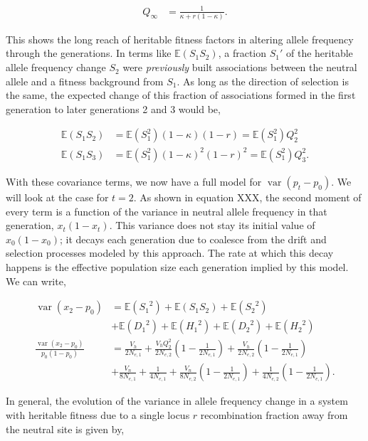 \documentclass[11pt]{article}
\newcommand{\E}{\mathbb{E}}
\DeclareMathOperator{\var}{var}
\begin{document}
\begin{align}
  \label{eq:Qinf}
  Q_\infty &= \frac{1}{\kappa + r(1-\kappa)}.
\end{align}

This shows the long reach of heritable fitness factors in altering allele
frequency through the generations. In terms like $\E(S_1 S_2)$, a fraction
$S_1'$ of the heritable allele frequency change $S_2$ were \emph{previously}
built associations between the neutral allele and a fitness background from
$S_1$. As long as the direction of selection is the same, the expected change
of this fraction of associations formed in the first generation to later
generations 2 and 3 would be,

\begin{align}
  \E(S_1 S_2) &= \E(S_1^2) (1-\kappa)(1-r) = \E(S_1^2) Q_2^2 \\
  \E(S_1 S_3) &= \E(S_1^2) (1-\kappa)^2(1-r)^2 = \E(S_1^2) Q_3^2.
\end{align}

With these covariance terms, we now have a full model for $\var(p_t - p_0)$. We
will look at the case for $t=2$. As shown in equation XXX, the second moment of
every term is a function of the variance in neutral allele frequency in that
generation, $x_t(1-x_t)$. This variance does not stay its initial value of
$x_0(1-x_0)$; it decays each generation due to coalesce from the drift and
selection processes modeled by this approach. The rate at which this decay
happens is the effective population size each generation implied by this model. 
We can write,

\begin{align}
    \label{eq:vardecay}
  \var(x_2 - p_0) &= \E({S_1}^2) + \E(S_1 S_2) + \E({S_2}^2) \\
                  & + \E({D_1}^2) + \E({H_1}^2) + \E({D_2}^2) + \E({H_2}^2) \\
  \frac{\var(x_2 - p_0)}{p_0(1-p_0)} &= \frac{V_h}{2N_{e,1}} + \frac{V_h Q_2^2}{2N_{e,2}}\left(1-\frac{1}{2N_{e,1}}\right)  +  \frac{V_h}{2N_{e,2}}  \left(1-\frac{1}{2N_{e,1}}\right)  \\ 
                                     &+ \frac{V_n}{8N_{e,1}} + \frac{1}{4N_{e,1}} + \frac{V_n}{8N_{e,2}}  \left(1 - \frac{1}{2N_{e,1}}\right) 
+ \frac{1}{4N_{e,2}} \left(1 - \frac{1}{2N_{e,1}}\right).
\end{align}

In general, the evolution of the variance in allele frequency change in a
system with heritable fitness due to a single locus $r$ recombination fraction
away from the neutral site is given by,
\end{document}
